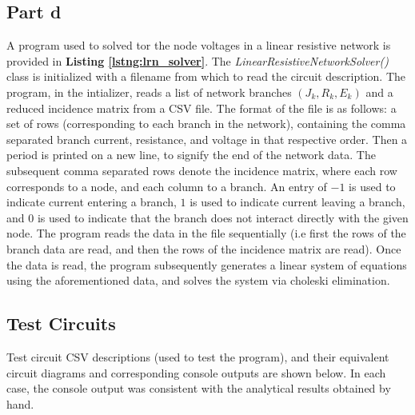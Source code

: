 \documentclass[11pt]{amsart}
\begin{document}
\subsection*{Part d}
A program used to solved tor the node voltages in a linear resistive network is provided in \textbf{Listing \ref{lstng:lrn_solver}}. The \textit{LinearResistiveNetworkSolver()} class is initialized with a filename from which to read the circuit description. The program, in the intializer, reads a list of network branches $(J_k, R_k, E_k)$ and a reduced incidence matrix from a CSV file. The format of the file is as follows: a set of rows (corresponding to each branch in the network), containing the comma separated branch current, resistance, and voltage in that respective order. Then a period is printed on a new line, to signify the end of the network data. The subsequent comma separated rows denote the incidence matrix, where each row corresponds to a node, and each column to a branch. An entry of $-1$ is used to indicate current entering a branch, $1$ is used to indicate current leaving a branch, and $0$ is used to indicate that the branch does not interact directly with the given node. The program reads the data in the file sequentially (i.e first the rows of the branch data are read, and then the rows of the incidence matrix are read). Once the data is read, the program subsequently generates a linear system of equations using the aforementioned data, and solves the system via choleski elimination.

\subsection*{Test Circuits} Test circuit CSV descriptions (used to test the program), and their equivalent circuit diagrams and corresponding console outputs are shown below. In each case, the console output was consistent with the analytical results obtained by hand.\\[0.1in]
\pagebreak
\end{document}
